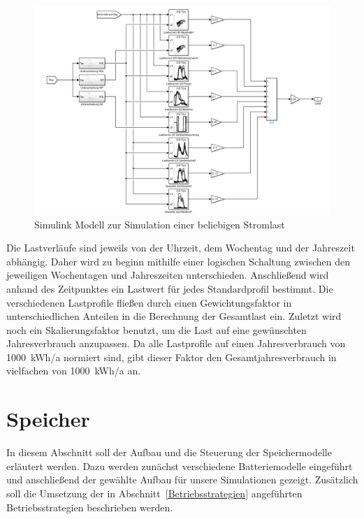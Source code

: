 \begin{figure}[H]
	\centering
	\includegraphics[width=0.9\linewidth]{Abbildungen/LastBilanziell.png}
	\caption{Simulink Modell zur Simulation einer beliebigen Stromlast}
	\label{fig:Last}
\end{figure}

Die Lastverläufe sind jeweils von der Uhrzeit, dem Wochentag und der Jahreszeit abhängig. Daher wird zu beginn mithilfe einer logischen Schaltung zwischen den jeweiligen Wochentagen und Jahreszeiten unterschieden. Anschließend wird anhand des Zeitpunktes ein Lastwert für jedes Standardprofil bestimmt. Die verschiedenen Lastprofile fließen durch einen Gewichtungsfaktor in unterschiedlichen Anteilen in die Berechnung der Gesamtlast ein. Zuletzt wird noch ein Skalierungsfaktor benutzt, um die Last auf eine gewünschten Jahresverbrauch anzupassen. Da alle Lastprofile auf einen Jahresverbrauch von 1000~kWh/a normiert sind, gibt dieser Faktor den Gesamtjahresverbrauch in vielfachen von 1000~kWh/a an.
\section{Speicher}\label{Speicher}
In diesem Abschnitt soll der Aufbau und die Steuerung der Speichermodelle erläutert werden.
Dazu werden zunächst verschiedene Batteriemodelle eingeführt und anschließend der gewählte Aufbau für
unsere Simulationen gezeigt. 
Zusätzlich soll die Umsetzung der in Abschnitt~\ref{Betriebsstrategien} angeführten Betriebsstrategien 
beschrieben werden.

